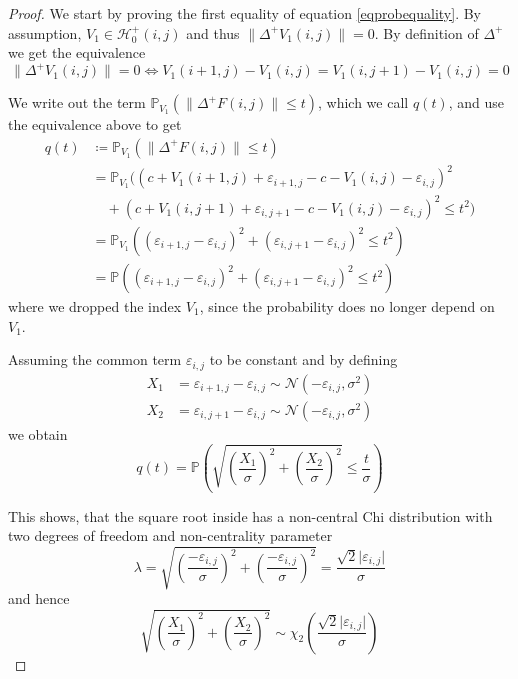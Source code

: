 \documentclass[a4paper,12pt]{article}
\newcommand{\abs}[1]{\lvert#1\rvert}
\newcommand{\norm}[1]{\lVert#1\rVert}
\theoremstyle{plain}
\theoremstyle{definition}
\begin{document}
\begin{proof}
	We start by proving the first equality of equation \eqref{eqprobequality}. By assumption, $V_1 \in \mathcal{H}_0^+(i, j)$ and thus $\norm{\Delta^+ V_1(i, j)} = 0$. By definition of $\Delta^+$ we get the equivalence
	\begin{equation*}
		\norm{\Delta^+ V_1(i, j)} = 0 \Leftrightarrow V_1(i + 1, j) - V_1(i, j) = V_1(i, j + 1) - V_1(i, j) = 0
	\end{equation*}
	
	We write out the term $\mathbb{P}_{V_1}( \norm{\Delta^+ F(i, j)} \leq t )$, which we call $q(t)$, and use the equivalence above to get
	\begin{align*}
		q(t) &\coloneqq \mathbb{P}_{V_1}( \norm{\Delta^+ F(i, j)} \leq t ) \\
		&= \mathbb{P}_{V_1}\big( (c + V_1(i + 1, j) + \varepsilon_{i + 1, j} - c - V_1(i, j) - \varepsilon_{i, j})^2 \\
		&\quad + (c + V_1(i, j + 1) + \varepsilon_{i, j + 1} - c - V_1(i, j) - \varepsilon_{i, j})^2 \leq t^2 \big) \\
		&= \mathbb{P}_{V_1}\left( (\varepsilon_{i + 1, j} - \varepsilon_{i, j})^2 + (\varepsilon_{i, j + 1} - \varepsilon_{i, j})^2 \leq t^2 \right) \\
		&= \mathbb{P}\left( (\varepsilon_{i + 1, j} - \varepsilon_{i, j})^2 + (\varepsilon_{i, j + 1} - \varepsilon_{i, j})^2 \leq t^2 \right)
	\end{align*}
	where we dropped the index $V_1$, since the probability does no longer depend on $V_1$.
	
	Assuming the common term $\varepsilon_{i, j}$ to be constant and by defining
	\begin{align*}
		X_1 &= \varepsilon_{i + 1, j} - \varepsilon_{i, j} \sim \mathcal{N}(- \varepsilon_{i, j}, \sigma^2) \\
		X_2 &= \varepsilon_{i, j + 1} - \varepsilon_{i, j} \sim \mathcal{N}(- \varepsilon_{i, j}, \sigma^2)
	\end{align*}
	we obtain
	\begin{equation*}
		q(t) = \mathbb{P}\left( \sqrt{\left( \frac{X_1}{\sigma} \right)^2 + \left( \frac{X_2}{\sigma} \right)^2} \leq \frac{t}{\sigma} \right)
	\end{equation*}
	
	This shows, that the square root inside has a non-central Chi distribution with two degrees of freedom and non-centrality parameter
	\begin{equation*}
		\lambda = \sqrt{\left( \frac{- \varepsilon_{i, j}}{\sigma} \right)^2 + \left( \frac{- \varepsilon_{i, j}}{\sigma} \right)^2} = \frac{\sqrt{2} \abs{\varepsilon_{i, j}}}{\sigma}
	\end{equation*}
	and hence
	\begin{equation*}
		\sqrt{\left( \frac{X_1}{\sigma} \right)^2 + \left( \frac{X_2}{\sigma} \right)^2} \sim \chi_2 \left( \frac{\sqrt{2} \abs{\varepsilon_{i, j}}}{\sigma} \right)
	\end{equation*}
	

\end{proof}
\end{document}
